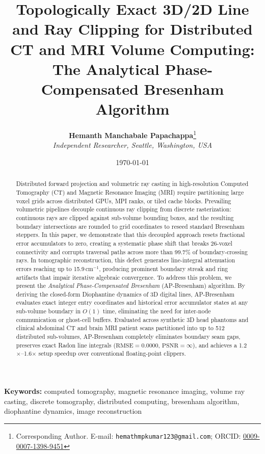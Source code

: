 \documentclass[journal=dme,manuscript=article,11pt]{article}
\title{\textbf{Topologically Exact 3D/2D Line and Ray Clipping for Distributed CT and MRI Volume Computing: The Analytical Phase-Compensated Bresenham Algorithm}}
\author{
    \textbf{Hemanth Manchabale Papachappa}\thanks{Corresponding Author. E-mail: \texttt{hemathmpkumar123@gmail.com}; ORCID: \href{https://orcid.org/0009-0007-1398-9451}{0009-0007-1398-9451}}\\
    \textit{Independent Researcher, Seattle, Washington, USA}
}
\date{\today}
\begin{document}
\maketitle

\vspace{-0.5cm}
\begin{abstract}
Distributed forward projection and volumetric ray casting in high-resolution Computed Tomography (CT) and Magnetic Resonance Imaging (MRI) require partitioning large voxel grids across distributed GPUs, MPI ranks, or tiled cache blocks. Prevailing volumetric pipelines decouple continuous ray clipping from discrete rasterization: continuous rays are clipped against sub-volume bounding boxes, and the resulting boundary intersections are rounded to grid coordinates to reseed standard Bresenham steppers. In this paper, we demonstrate that this decoupled approach resets fractional error accumulators to zero, creating a systematic phase shift that breaks 26-voxel connectivity and corrupts traversal paths across more than 99.7\% of boundary-crossing rays. In tomographic reconstruction, this defect generates line-integral attenuation errors reaching up to 15.9\,cm$^{-1}$, producing prominent boundary streak and ring artifacts that impair iterative algebraic convergence. To address this problem, we present the \emph{Analytical Phase-Compensated Bresenham} (AP-Bresenham) algorithm. By deriving the closed-form Diophantine dynamics of 3D digital lines, AP-Bresenham evaluates exact integer entry coordinates and historical error accumulator states at any sub-volume boundary in $O(1)$ time, eliminating the need for inter-node communication or ghost-cell buffers. Evaluated across synthetic 3D head phantoms and clinical abdominal CT and brain MRI patient scans partitioned into up to 512 distributed sub-volumes, AP-Bresenham completely eliminates boundary seam gaps, preserves exact Radon line integrals ($\mathrm{RMSE} = 0.0000$, $\mathrm{PSNR} = \infty$), and achieves a 1.2$\times$--1.6$\times$ setup speedup over conventional floating-point clippers.
\end{abstract}

\vspace{0.2cm}
\noindent \textbf{Keywords:} computed tomography, magnetic resonance imaging, volume ray casting, discrete tomography, distributed computing, bresenham algorithm, diophantine dynamics, image reconstruction

\newpage

\end{document}

